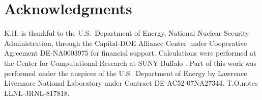 \documentclass[reprint,aps,prl,twocolumn,letterpaper]{revtex4-2}
\begin{document}
\section{Acknowledgments}

K.H. is thankful to the U.S.\ Department of Energy, National Nuclear Security Administration, through the Capital-DOE Alliance Center under Cooperative Agreement DE-NA0003975 for financial support. Calculations were performed at the Center for Computational Research at SUNY Buffalo \cite{ccr}. Part of this work was performed under the auspices of the U.S.\ Department of Energy by Lawrence Livermore National
Laboratory under Contract DE-AC52-07NA27344. T.O.notes LLNL-JRNL-817818.



\end{document}
